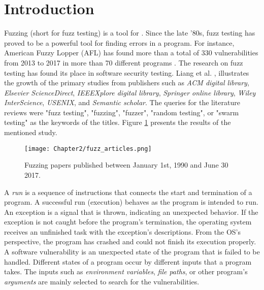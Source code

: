 \section{Introduction} \label{sec:2.1}


Fuzzing (short for fuzz testing) is a tool for . Since the late '80s, fuzz testing has proved to be a powerful tool for finding errors in a program. For instance, American Fuzzy Lopper (AFL) has found more than a total of 330 vulnerabilities from 2013 to 2017 in more than 70 different programs \cite{afl_cve}. The research on fuzz testing has found its place in software security testing. Liang et al. \cite{liang2018fuzzing}, illustrates the growth of the primary studies from publishers such as \textit{ACM digital library}, \textit{Elsevier ScienceDirect}, \textit{IEEEXplore digital library}, \textit{Springer online library}, \textit{Wiley InterScience}, \textit{USENIX}, and \textit{Semantic scholar}. The queries for the literature reviews were "fuzz testing", "fuzzing", "fuzzer", "random testing", or "swarm testing" as the keywords of the titles. Figure \ref{fig:fuzz_articles} presents the results of the mentioned study.

\begin{figure}[!t]
    \texttt{[image: Chapter2/fuzz\_articles.png]}
    \centering
    \caption{Fuzzing papers published between January 1st, 1990 and June 30 2017. \cite{liang2018fuzzing}}
    \label{fig:fuzz_articles}
\end{figure}

A \textit{run} is a sequence of instructions that connects the start and termination of a program. A successful run (execution) behaves as the program is intended to run. An exception is a signal that is thrown, indicating an unexpected behavior. If the exception is not caught before the program's termination, the operating system receives an unfinished task with the exception's descriptions. From the OS's perspective, the program has crashed and could not finish its execution properly. A software vulnerability is an unexpected state of the program that is failed to be handled. Different states of a program occur by different inputs that a program takes. The inputs such as \textit{environment variables}, \textit{file paths}, or other program's \textit{arguments} are mainly selected to search for the vulnerabilities. 

